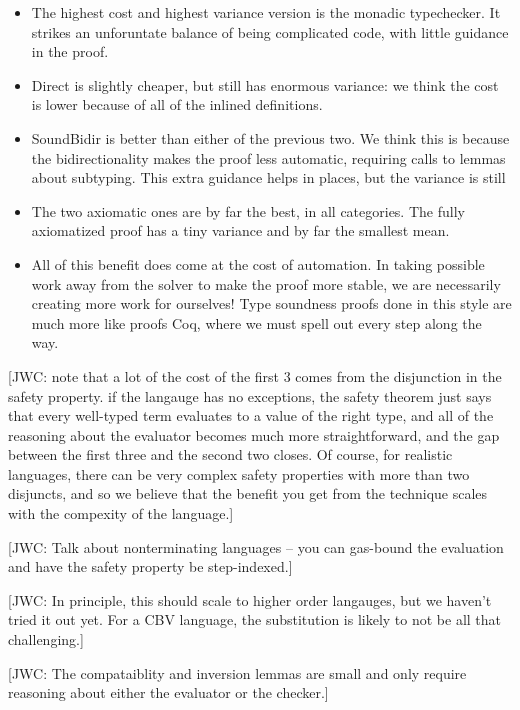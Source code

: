 \documentclass[sigplan,review,screen,anonymous]{acmart}
\newcommand{\comm}[3]{\textcolor{#1}{[#2: #3]}}
\newcommand{\jwc}[1]{\comm{dkgreen}{JWC}{#1}}
\begin{document}
\begin{itemize}
  \item The highest cost and highest variance version is the monadic typechecker. It strikes an unforuntate balance of being complicated code, with little guidance in the proof.
  \item Direct is slightly cheaper, but still has enormous variance: we think the cost is lower because of all of the inlined definitions.
  \item SoundBidir is better than either of the previous two. We think this is because the bidirectionality makes the proof less automatic, requiring calls to lemmas about subtyping.
        This extra guidance helps in places, but the variance is still 
  \item The two axiomatic ones are by far the best, in all categories. The fully axiomatized proof has a tiny variance and by far the smallest mean.
  \item All of this benefit does come at the cost of automation. In taking possible work away from the solver to make the proof more stable, we are necessarily creating more work for ourselves!
        Type soundness proofs done in this style are much more like proofs Coq, where we must spell out every step along the way.
\end{itemize}

\jwc{note that a lot of the cost of the first 3 comes from the disjunction in the safety property. if the langauge has no exceptions, the safety theorem just says that every well-typed term evaluates to a value of the right type, and
all of the reasoning about the evaluator becomes much more straightforward, and the gap between the first three and the second two closes. Of course, for realistic languages, there can be very complex safety properties with more than two disjuncts, and so
we believe that the benefit you get from the technique scales with the compexity of the language.}

\jwc{Talk about nonterminating languages -- you can gas-bound the evaluation and have the safety property be step-indexed.}

\jwc{In principle, this should scale to higher order langauges, but we haven't tried it out yet. For a CBV language, the substitution is likely to not be all that challenging.}

\jwc{The compataiblity and inversion lemmas are small and only require reasoning about either the evaluator or the checker.}







\end{document}
